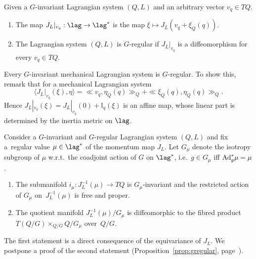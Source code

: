 \begin{definition} Given a $G$-invariant Lagrangian system $(Q,L)$ and an arbitrary vector $v_q\in TQ$.{\samepage
\begin{enumerate}\itemsep=0pt
\item The map $J_L|_{v_q}: \lag \to \lag^*$ is the map $\xi \mapsto J_L(v_q+\xi_Q(q))$.
\item The Lagrangian system $(Q,L)$ is  $G$-regular if $J_L|_{v_q}$ is a dif\/feomorphism for every $v_q\in TQ$.
\end{enumerate}}
\end{definition}

Every $G$-invariant mechanical Lagrangian system is $G$-regular. To show this, remark that for a mechanical Lagrangian system \[\langle J_L|_{v_q}(\xi)  , \eta \rangle =\ll v_q,\eta_Q(q)\gg_Q+ \ll \xi_Q(q), \eta_Q(q)\gg_Q.\] Hence $J_L|_{v_q}(\xi) = J_L|_{v_q}(0) + \mathbb{I}_q(\xi)$ is an af\/f\/ine map, whose linear part is determined by the inertia metric on $\lag$.
\begin{proposition}
Consider a $G$-invariant and $G$-regular Lagrangian system $(Q,L)$ and fix a~re\-gu\-lar value $\mu\in\lag^*$ of the momentum map $J_L$. Let $G_\mu$ denote the isotropy subgroup of $\mu$ w.r.t.\ the coadjoint action of $G$ on $\lag^*$, i.e.\ $g\in G_\mu$ iff ${\rm Ad}^*_g\mu = \mu$.
\begin{enumerate}\itemsep=0pt
\item[$1.$] The submanifold $i_\mu:J^{-1}_L(\mu)\to TQ$ is $G_\mu$-invariant and the restricted action of $G_\mu$ on~$J^{-1}_L(\mu)$ is free and proper.
\item[$2.$] The quotient manifold $J^{-1}_L(\mu)/G_\mu$ is diffeomorphic to the fibred product $T(Q/G) \times_{Q/G} Q/G_\mu$ over~$Q/G$.
\end{enumerate}
\end{proposition}
The f\/irst statement is a direct consequence of the equivariance of $J_L$. We postpone a proof of the second statement (Proposition~\ref{prop:gregular}, page~\pageref{prop:gregular}).

